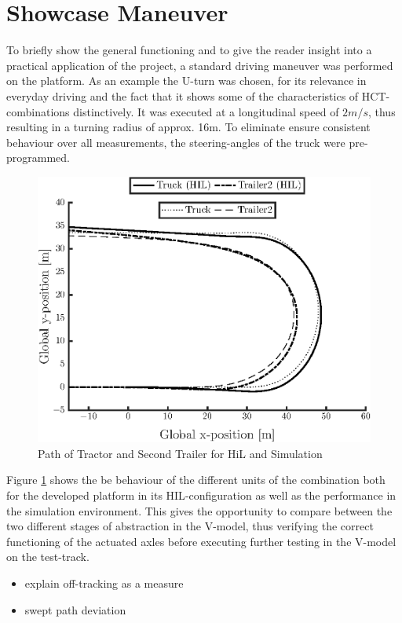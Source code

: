 \documentclass[root.tex]{subfiles}
\begin{document}
	
	{\pagestyle{empty}}
	\section{Showcase Maneuver}
	\label{chap:Showcase_Maneuver}
	To briefly show the general functioning and to give the reader insight into a practical application of the project, a standard driving maneuver was performed on the platform. As an example the U-turn was chosen, for its relevance in everyday driving and the fact that it shows some of the characteristics of \gls{HCT}-combinations distinctively. It was executed at a longitudinal speed of $2m/s$, thus resulting in a turning radius of approx. 16m. To eliminate ensure consistent behaviour over all measurements, the steering-angles of the truck were pre-programmed.
	
	\begin{figure}[!h]
		
		\includegraphics[width=1\linewidth]{xy_HIL_and_VTM}
		\caption[Path of Tractor and Second Trailer for HiL and Simulation]{Path of Tractor and Second Trailer for HiL and Simulation}
		
		\label{fig:Path}
	\end{figure}
	
	
	Figure \ref{fig:Path} shows the be behaviour of the different units of the combination both for the developed platform in its \gls{HIL}-configuration as well as the performance in the simulation environment. This gives the opportunity to compare between the two different stages of abstraction in the V-model, thus verifying the correct functioning of the actuated axles before executing further testing in the V-model on the test-track. 
	
	\begin{itemize}
		\item explain off-tracking as a measure 
		\item swept path deviation	
	\end{itemize}
	
\end{document}
